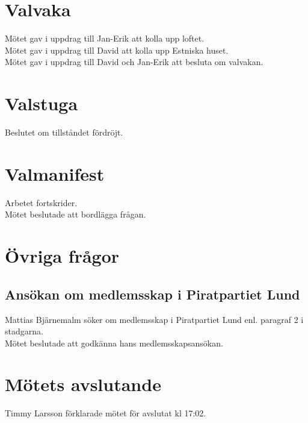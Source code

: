 \documentclass[a4paper,10pt]{article}
\begin{document}
\section{Valvaka}
Mötet gav i uppdrag till Jan-Erik att kolla upp loftet.\\
Mötet gav i uppdrag till David att kolla upp Estniska huset.\\
Mötet gav i uppdrag till David och Jan-Erik att besluta om valvakan.

\section{Valstuga}
Beslutet om tillståndet fördröjt.

\section{Valmanifest}
Arbetet fortskrider.\\
Mötet beslutade att bordlägga frågan.

\section{Övriga frågor}
\subsection*{Ansökan om medlemsskap i Piratpartiet Lund}
Mattias Bjärnemalm söker om medlemsskap i Piratpartiet Lund enl. paragraf 2 i stadgarna.\\
Mötet beslutade att godkänna hans medlemsskapsansökan.

\section{Mötets avslutande}
Timmy Larsson förklarade mötet för avslutat kl 17:02.
\end{document}
